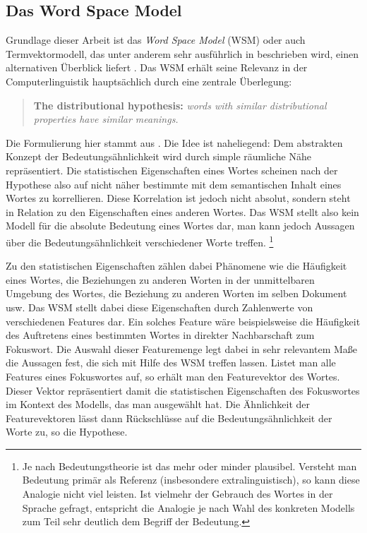 \documentclass[11pt,numbers=noenddot]{scrartcl}
\begin{document}
\subsection{Das Word Space Model}\label{wsm}
Grundlage dieser Arbeit ist das \emph{Word Space Model} (WSM) oder auch Termvektormodell, das unter anderem sehr ausführlich in \citet{sahlgren2006word} beschrieben wird, einen alternativen Überblick liefert \citet{Turney10fromfrequency}. Das WSM erhält seine Relevanz in der Computerlinguistik hauptsächlich durch eine zentrale Überlegung:
\begin{quote}
    \textbf{The distributional hypothesis:} \emph{words with similar distributional properties have similar meanings.}
\end{quote}
Die Formulierung hier stammt aus \citet[S. 21]{sahlgren2006word}. Die Idee ist naheliegend: Dem abstrakten Konzept der Bedeutungsähnlichkeit wird durch simple räumliche Nähe repräsentiert. Die statistischen Eigenschaften eines Wortes scheinen nach der Hypothese also auf nicht näher bestimmte mit dem semantischen Inhalt eines Wortes zu korrellieren. Diese Korrelation ist jedoch nicht absolut, sondern steht in Relation zu den Eigenschaften eines anderen Wortes. Das WSM stellt also kein Modell für die absolute Bedeutung eines Wortes dar, man kann jedoch Aussagen über die Bedeutungsähnlichkeit verschiedener Worte treffen. \footnote{Je nach Bedeutungstheorie ist das mehr oder minder plausibel. Versteht man Bedeutung primär als Referenz (insbesondere extralinguistisch), so kann diese Analogie nicht viel leisten. Ist vielmehr der Gebrauch des Wortes in der Sprache gefragt, entspricht die Analogie je nach Wahl des konkreten Modells zum Teil sehr deutlich dem Begriff der Bedeutung.}

Zu den statistischen Eigenschaften zählen dabei Phänomene wie die Häufigkeit eines Wortes, die Beziehungen zu anderen Worten in der unmittelbaren Umgebung des Wortes, die Beziehung zu anderen Worten im selben Dokument usw. Das WSM stellt dabei diese Eigenschaften durch Zahlenwerte von verschiedenen Features dar. Ein solches Feature wäre beispielsweise die Häufigkeit des Auftretens eines bestimmten Wortes in direkter Nachbarschaft zum Fokuswort. Die Auswahl dieser Featuremenge legt dabei in sehr relevantem Maße die Aussagen fest, die sich mit Hilfe des WSM treffen lassen. Listet man alle Features eines Fokuswortes auf, so erhält man den Featurevektor des Wortes. Dieser Vektor repräsentiert damit die statistischen Eigenschaften des Fokuswortes im Kontext des Modells, das man ausgewählt hat. Die Ähnlichkeit der Featurevektoren lässt dann Rückschlüsse auf die Bedeutungsähnlichkeit der Worte zu, so die Hypothese.
\end{document}
